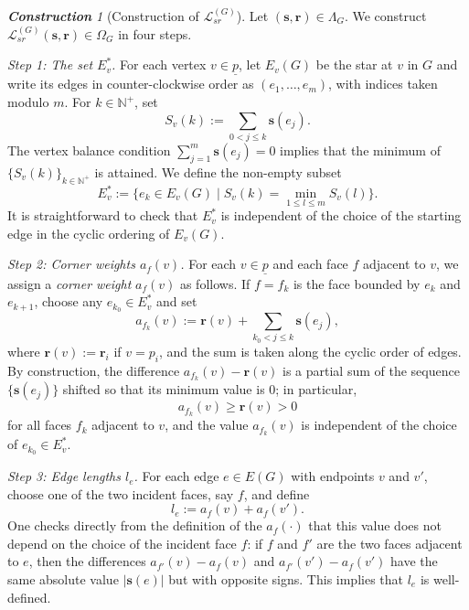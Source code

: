\documentclass[11pt, letterpaper]{amsart}
\theoremstyle{definition}
\theoremstyle{remark}
\newtheorem{construction}[theorem]{\rm\bf Construction}
\newcommand{\up}{\underline{p}}
\numberwithin{equation}{section}
\begin{document}
\begin{construction}[Construction of \(\mathcal{L}^{(G)}_{sr}\)]
\label{const:LG.map}
Let \((\mathbf{s},\mathbf{r})\in\Lambda_G\).
We construct \(\mathcal{L}^{(G)}_{sr}(\mathbf{s},\mathbf{r})\in\Omega_G\) in four steps.

\medskip\noindent
\emph{Step 1: The set \(E_v^*\).}
For each vertex \(v\in\up\), let \(E_v(G)\) be the star at \(v\) in $G$ and write its edges in counter-clockwise order as \((e_1,\dots,e_m)\), with indices taken modulo \(m\).
For \(k\in \mathbb{N}^+\), set
\[
S_v(k) := \sum_{0<j\le k} \mathbf{s}(e_j).
\]
The vertex balance condition \(\sum_{j=1}^m \mathbf{s}(e_j)=0\) implies that the minimum of \(\{S_v(k)\}_{k\in\mathbb{N}^+}\) is attained.
We define the non-empty subset
\[
E_v^* := \bigl\{ e_k\in E_v(G) \;\big|\; S_v(k) = \min_{1\le l\le m} S_v(l) \bigr\}.
\]
It is straightforward to check that \(E_v^*\) is independent of the choice of the starting edge in the cyclic ordering of \(E_v(G)\).

\medskip\noindent
\emph{Step 2: Corner weights \(a_f(v)\).}
For each \(v\in\up\) and each face \(f\) adjacent to \(v\), we assign a \emph{corner weight} \(a_f(v)\) as follows.
If \(f=f_k\) is the face bounded by \(e_k\) and \(e_{k+1}\), choose any \(e_{k_0}\in E_v^*\) and set
\begin{equation}
    \label{eq:def.a_f}
    a_{f_k}(v) := \mathbf{r}(v) + \sum_{k_0<j\le k} \mathbf{s}(e_j),
\end{equation}
where \(\mathbf{r}(v):=\mathbf{r}_i\) if \(v=p_i\), and the sum is taken along the cyclic order of edges.
By construction, the difference \(a_{f_k}(v)-\mathbf{r}(v)\) is a partial sum of the sequence \(\{\mathbf{s}(e_j)\}\) shifted so that its minimum value is \(0\); in particular,
\[
a_{f_k}(v) \ge \mathbf{r}(v) > 0
\]
for all faces \(f_k\) adjacent to \(v\), and the value \(a_{f_k}(v)\) is independent of the choice of \(e_{k_0}\in E_v^*\).

\medskip\noindent
\emph{Step 3: Edge lengths \(l_e\).}
For each edge \(e\in E(G)\) with endpoints \(v\) and \(v'\), choose one of the two incident faces, say \(f\), and define
\begin{equation}
    \label{eq:def.edge.sr}
    l_e := a_f(v) + a_f(v').
\end{equation}
One checks directly from the definition of the \(a_f(\cdot)\) that this value does not depend on the choice of the incident face \(f\): if \(f\) and \(f'\) are the two faces adjacent to \(e\), then the differences \(a_{f'}(v)-a_{f}(v)\) and \(a_{f'}(v')-a_f(v')\) have the same absolute value \(|\mathbf{s}(e)|\) but with opposite signs. This implies that $l_e$ is well-defined.


\end{construction}
\end{document}
